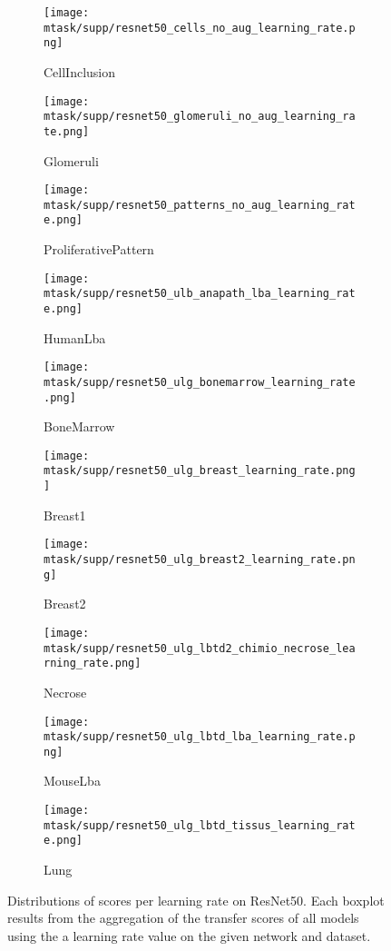 \begin{figure*}[h]
  \centering
  \begin{subfigure}{0.48\textwidth}
      \centering
      \texttt{[image: mtask/supp/resnet50\_cells\_no\_aug\_learning\_rate.png]}
    \caption{CellInclusion}
    \end{subfigure}
  \begin{subfigure}{0.48\textwidth}
    \centering
    \texttt{[image: mtask/supp/resnet50\_glomeruli\_no\_aug\_learning\_rate.png]}\\
    \caption{Glomeruli}
  \end{subfigure}
  \begin{subfigure}{0.48\textwidth}
    \centering
    \texttt{[image: mtask/supp/resnet50\_patterns\_no\_aug\_learning\_rate.png]}
    \caption{ProliferativePattern}
  \end{subfigure}
  \begin{subfigure}{0.48\textwidth}
    \centering
    \texttt{[image: mtask/supp/resnet50\_ulb\_anapath\_lba\_learning\_rate.png]}\\
    \caption{HumanLba}
  \end{subfigure}
  \begin{subfigure}{0.48\textwidth}
    \centering
    \texttt{[image: mtask/supp/resnet50\_ulg\_bonemarrow\_learning\_rate.png]}
    \caption{BoneMarrow}
  \end{subfigure}
  \begin{subfigure}{0.48\textwidth}
    \centering
    \texttt{[image: mtask/supp/resnet50\_ulg\_breast\_learning\_rate.png]}\\
    \caption{Breast1}
  \end{subfigure}
  \begin{subfigure}{0.48\textwidth}
    \centering
    \texttt{[image: mtask/supp/resnet50\_ulg\_breast2\_learning\_rate.png]}
    \caption{Breast2}
  \end{subfigure}
  \begin{subfigure}{0.48\textwidth}
    \centering
    \texttt{[image: mtask/supp/resnet50\_ulg\_lbtd2\_chimio\_necrose\_learning\_rate.png]}\\
    \caption{Necrose}
  \end{subfigure}
  \begin{subfigure}{0.48\textwidth}
    \centering
    \texttt{[image: mtask/supp/resnet50\_ulg\_lbtd\_lba\_learning\_rate.png]}
    \caption{MouseLba}
  \end{subfigure}
  \begin{subfigure}{0.48\textwidth}
    \centering
    \texttt{[image: mtask/supp/resnet50\_ulg\_lbtd\_tissus\_learning\_rate.png]}
    \caption{Lung}
  \end{subfigure}
  \caption{Distributions of scores per learning rate on ResNet50. Each boxplot results from the aggregation of the transfer scores of all models using the a learning rate value on the given network and dataset.}
  \label{app:mtask:fig:lr_resnet}
\end{figure*}